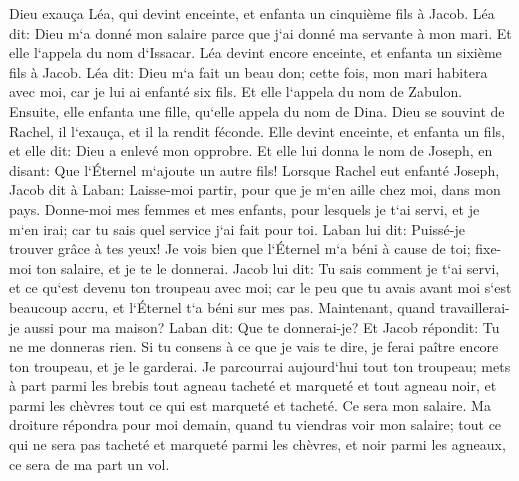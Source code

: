 \verse Dieu exauça Léa, qui devint enceinte, et enfanta un cinquième fils à Jacob. 
\verse Léa dit: Dieu m`a donné mon salaire parce que j`ai donné ma servante à mon mari. Et elle l`appela du nom d`Issacar. 
\verse Léa devint encore enceinte, et enfanta un sixième fils à Jacob. 
\verse Léa dit: Dieu m`a fait un beau don; cette fois, mon mari habitera avec moi, car je lui ai enfanté six fils. Et elle l`appela du nom de Zabulon. 
\verse Ensuite, elle enfanta une fille, qu`elle appela du nom de Dina. 
\verse Dieu se souvint de Rachel, il l`exauça, et il la rendit féconde. 
\verse Elle devint enceinte, et enfanta un fils, et elle dit: Dieu a enlevé mon opprobre. 
\verse Et elle lui donna le nom de Joseph, en disant: Que l`Éternel m`ajoute un autre fils! 
\verse Lorsque Rachel eut enfanté Joseph, Jacob dit à Laban: Laisse-moi partir, pour que je m`en aille chez moi, dans mon pays. 
\verse Donne-moi mes femmes et mes enfants, pour lesquels je t`ai servi, et je m`en irai; car tu sais quel service j`ai fait pour toi. 
\verse Laban lui dit: Puissé-je trouver grâce à tes yeux! Je vois bien que l`Éternel m`a béni à cause de toi; 
\verse fixe-moi ton salaire, et je te le donnerai. 
\verse Jacob lui dit: Tu sais comment je t`ai servi, et ce qu`est devenu ton troupeau avec moi; 
\verse car le peu que tu avais avant moi s`est beaucoup accru, et l`Éternel t`a béni sur mes pas. Maintenant, quand travaillerai-je aussi pour ma maison? 
\verse Laban dit: Que te donnerai-je? Et Jacob répondit: Tu ne me donneras rien. Si tu consens à ce que je vais te dire, je ferai paître encore ton troupeau, et je le garderai. 
\verse Je parcourrai aujourd`hui tout ton troupeau; mets à part parmi les brebis tout agneau tacheté et marqueté et tout agneau noir, et parmi les chèvres tout ce qui est marqueté et tacheté. Ce sera mon salaire. 
\verse Ma droiture répondra pour moi demain, quand tu viendras voir mon salaire; tout ce qui ne sera pas tacheté et marqueté parmi les chèvres, et noir parmi les agneaux, ce sera de ma part un vol. 
